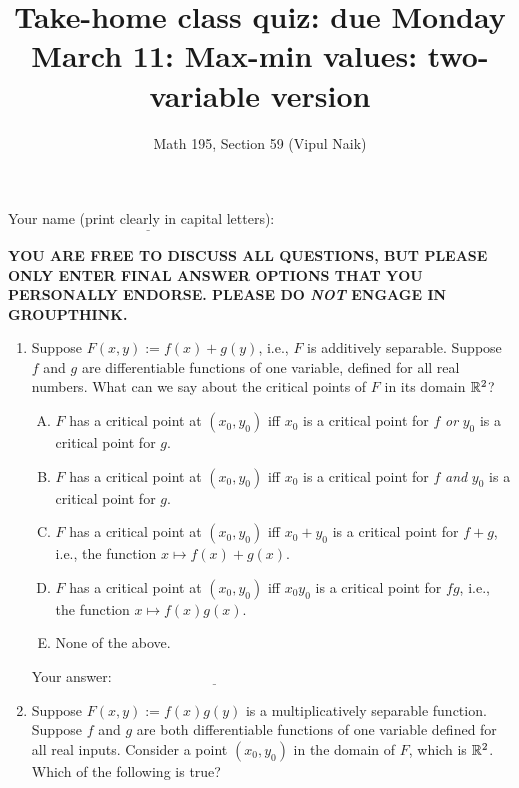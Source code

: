 \documentclass[10pt]{amsart}
\title{Take-home class quiz: due Monday March 11: Max-min values: two-variable version}
\author{Math 195, Section 59 (Vipul Naik)}
\begin{document}
\maketitle

Your name (print clearly in capital letters): $\underline{\qquad\qquad\qquad\qquad\qquad\qquad\qquad\qquad\qquad\qquad}$

{\bf YOU ARE FREE TO DISCUSS ALL QUESTIONS, BUT PLEASE ONLY ENTER FINAL ANSWER OPTIONS THAT YOU PERSONALLY ENDORSE. PLEASE DO {\em NOT} ENGAGE IN  GROUPTHINK.}

\begin{enumerate}
\item Suppose $F(x,y) := f(x) + g(y)$, i.e., $F$ is additively
  separable. Suppose $f$ and $g$ are differentiable functions of one
  variable, defined for all real numbers. What can we say about the
  critical points of $F$ in its domain $\mathbb{R}^2$?

  \begin{enumerate}[(A)]
  \item $F$ has a critical point at $(x_0,y_0)$ iff $x_0$ is a
    critical point for $f$ {\em or} $y_0$ is a critical point for $g$.
  \item $F$ has a critical point at $(x_0,y_0)$ iff $x_0$ is a
    critical point for $f$ {\em and} $y_0$ is a critical point for
    $g$.
  \item $F$ has a critical point at $(x_0,y_0)$ iff $x_0 + y_0$ is a
    critical point for $f + g$, i.e., the function $x \mapsto f(x) +
    g(x)$.
  \item $F$ has a critical point at $(x_0,y_0)$ iff $x_0y_0$ is a
    critical point for $fg$, i.e., the function $x \mapsto f(x)g(x)$.
  \item None of the above.
  \end{enumerate}
  
  \vspace{0.1in}
  Your answer: $\underline{\qquad\qquad\qquad\qquad\qquad\qquad\qquad}$
  \vspace{0.15in}

\item Suppose $F(x,y) := f(x)g(y)$ is a multiplicatively separable
  function. Suppose $f$ and $g$ are both differentiable functions of
  one variable defined for all real inputs. Consider a point
  $(x_0,y_0)$ in the domain of $F$, which is $\mathbb{R}^2$. Which of the
  following is true?


\end{enumerate}
\end{document}
